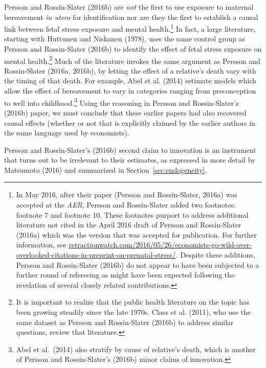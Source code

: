 \documentclass[a4paper,12pt]{article}
\begin{document}
Persson and Rossin-Slater (2016b) are \emph{not} the first to use exposure to maternal bereavement \emph{in utero} for identification nor are they the first to establish a causal link between fetal stress exposure and mental health.\footnote{In May 2016, after their paper (Persson and Rossin-Slater, 2016a) was accepted at the \emph{AER}, Persson and Rossin-Slater added two footnotes: footnote 7 and footnote 10. These footnotes purport to address additional literature not cited in the April 2016 draft of Persson and Rossin-Slater (2016a) which was the version that was accepted for publication. For further information, see \href{http://retractionwatch.com/2016/05/26/economists-go-wild-over-overlooked-citations-in-preprint-on-prenatal-stress/}{retractionwatch.com/2016/05/26/economists-go-wild-over-overlooked-citations-in-preprint-on-prenatal-stress/}. Despite these additions, Persson and Rossin-Slater (2016b) do not appear to have been subjected to a further round of refereeing as might have been expected following the revelation of several closely related contributions.} In fact, a large literature, starting with Huttunen and Niskanen (1978), uses the same control group as Persson and Rossin-Slater (2016b) to identify the effect of fetal stress exposure on mental health.\footnote{It is important to realize that the public health literature on the topic has been growing steadily since the late 1970s. Class et al. (2011), who use the same dataset as Persson and Rossin-Slater (2016b) to address similar questions, review that literature.} Much of the literature invokes the same argument as Persson and Rossin-Slater (2016a, 2016b), by letting the effect of a relative's death vary with the timing of that death. For example, Abel et al. (2014) estimate models which allow the effect of bereavement to vary in categories ranging from preconception to well into childhood.\footnote{Abel et al.~(2014) also stratify by cause of relative's death, which is another of Persson and Rossin-Slater's (2016b) minor claims of innovation.} Using the reasoning in Persson and Rossin-Slater's (2016b) paper, we must conclude that these earlier papers had also recovered causal effects (whether or not that is explicitly claimed by the earlier authors in the same language used by economists).

Persson and Rossin-Slater's (2016b) second claim to innovation is an instrument that turns out to be irrelevant to their estimates, as expressed in more detail by Matsumoto (2016) and summarized in Section~\ref{sec:endogeneity}.
\end{document}
